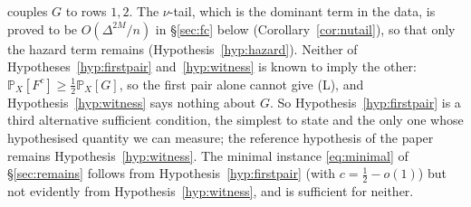\documentclass[11pt]{article}
\theoremstyle{definition}
\renewcommand{\Pr}{\mathbb{P}}
\begin{document}
couples $G$ to rows $1,2$.  The $\nu$-tail, which is the dominant term in the data, is
proved to be $O(\Delta^{2M}/n)$ in \S\ref{sec:fc} below (Corollary~\ref{cor:nutail}), so
that only the hazard term remains (Hypothesis~\ref{hyp:hazard}).  Neither of
Hypotheses~\ref{hyp:firstpair} and~\ref{hyp:witness} is known to imply the other: $\Pr_X[F^c]\ge\tfrac12\Pr_X[G]$, so the first pair alone cannot give (L),
and Hypothesis~\ref{hyp:witness} says nothing about $G$.  So
Hypothesis~\ref{hyp:firstpair} is a third alternative sufficient condition, the simplest
to state and the only one whose hypothesised quantity we can measure; the reference
hypothesis of the paper remains Hypothesis~\ref{hyp:witness}.  The minimal instance
\eqref{eq:minimal} of \S\ref{sec:remains} follows from Hypothesis~\ref{hyp:firstpair} (with
$c=\tfrac12-o(1)$) but not evidently from Hypothesis~\ref{hyp:witness}, and is sufficient
for neither.
\end{document}

